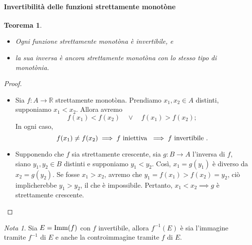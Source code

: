 \documentclass{article}
\theoremstyle{plain}
\newtheorem{thm}{Teorema}[section]
\theoremstyle{definition}
\theoremstyle{remark}
\newtheorem{note}{Nota}
\begin{document}
\paragraph{Invertibilità delle funzioni strettamente monotòne}
\begin{bxthm}
\begin{thm}\hfill 
    \begin{itemize}
        \item[($a$)] Ogni funzione strettamente monotòna è invertibile, e
        \item[($b$)] la sua inversa è ancora strettamente monotòna con lo stesso tipo di monotònia.
    \end{itemize}
\end{thm}
\end{bxthm}
\begin{proof}\hfill
    \begin{itemize}
        \item[($a$)] Sia \(f: A \to \mathbb{R}\) strettamente monotòna. 
        Prendiamo \(x_1, x_2 \in A\) distinti, supponiamo \(x_1 < x_2\). Allora avremo 
        \[f(x_1) < f(x_2)\quad\lor\quad f(x_1) > f(x_2);\]
        In ogni caso, 
        \[f(x_1) \neq f(x_2)\implies f\textup{ iniettiva }\implies f\textup{ invertibile }.\]
        \item[($b$)] Supponendo che \(f\) sia strettamente crescente, sia \(g: B \to A\) l'inversa di \(f\), siano \(y_1, y_2 \in B\) distinti e supponiamo $y_1<y_2$. 
        Così, \(x_1 = g(y_1)\) è diverso da \(x_2 = g(y_2)\). Se fosse \(x_1 > x_2\), avremo che \(y_1 = f(x_1) > f(x_2) = y_2\), ciò implicherebbe \(y_1 > y_2\), il che è impossibile. Pertanto, \(x_1 < x_2 \implies g\) è strettamente crescente.
    \end{itemize}
\end{proof}

\vspace{10pt}

\begin{note}
    Sia $E=\textup{Imm}(f)$ con $f$ invertibile, allora $f^{-1}(E)$ è sia l'immagine tramite $f^{-1}$ di $E$ e anche la controimmagine tramite $f$ di $E$.
\end{note}

\vspace{10pt}
\end{document}
